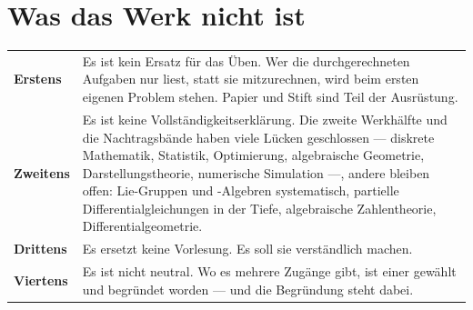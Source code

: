 \section*{Was das Werk nicht ist}

\begin{warnung}
\begin{center}
{\small
\renewcommand{\arraystretch}{1.55}
\begin{tabular}{@{}P{2.4cm}P{6.2cm}@{}}
\toprule
\textbf{Erstens} & Es ist kein Ersatz für das Üben. Wer die durchgerechneten Aufgaben nur liest, statt sie mitzurechnen, wird beim ersten eigenen Problem stehen. Papier und Stift sind Teil der Ausrüstung.\\
\textbf{Zweitens} & Es ist keine Vollständigkeitserklärung. Die zweite Werkhälfte und die Nachtragsbände haben viele Lücken geschlossen --- diskrete Mathematik, Statistik, Optimierung, algebraische Geometrie, Darstellungstheorie, numerische Simulation ---, andere bleiben offen: Lie-Gruppen und -Algebren systematisch, partielle Differentialgleichungen in der Tiefe, algebraische Zahlentheorie, Differentialgeometrie.\\
\textbf{Drittens} & Es ersetzt keine Vorlesung. Es soll sie verständlich machen.\\
\textbf{Viertens} & Es ist nicht neutral. Wo es mehrere Zugänge gibt, ist einer gewählt und begründet worden --- und die Begründung steht dabei.\\
\bottomrule
\end{tabular}}
\end{center}

\begin{center}
\begin{minipage}{0.88\textwidth}
\end{minipage}
\end{center}
\end{warnung}

